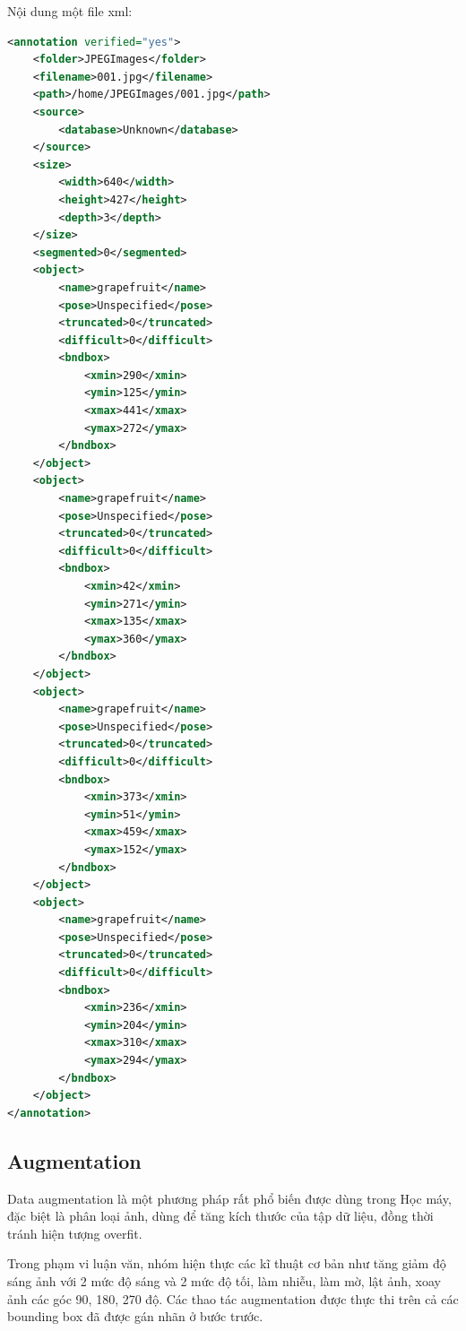 \cleardoublepage
Nội dung một file xml:
\begin{lstlisting}[language=XML]
<annotation verified="yes">
	<folder>JPEGImages</folder>
	<filename>001.jpg</filename>
	<path>/home/JPEGImages/001.jpg</path>
	<source>
		<database>Unknown</database>
	</source>
	<size>
		<width>640</width>
		<height>427</height>
		<depth>3</depth>
	</size>
	<segmented>0</segmented>
	<object>
		<name>grapefruit</name>
		<pose>Unspecified</pose>
		<truncated>0</truncated>
		<difficult>0</difficult>
		<bndbox>
			<xmin>290</xmin>
			<ymin>125</ymin>
			<xmax>441</xmax>
			<ymax>272</ymax>
		</bndbox>
	</object>
	<object>
		<name>grapefruit</name>
		<pose>Unspecified</pose>
		<truncated>0</truncated>
		<difficult>0</difficult>
		<bndbox>
			<xmin>42</xmin>
			<ymin>271</ymin>
			<xmax>135</xmax>
			<ymax>360</ymax>
		</bndbox>
	</object>
	<object>
		<name>grapefruit</name>
		<pose>Unspecified</pose>
		<truncated>0</truncated>
		<difficult>0</difficult>
		<bndbox>
			<xmin>373</xmin>
			<ymin>51</ymin>
			<xmax>459</xmax>
			<ymax>152</ymax>
		</bndbox>
	</object>
	<object>
		<name>grapefruit</name>
		<pose>Unspecified</pose>
		<truncated>0</truncated>
		<difficult>0</difficult>
		<bndbox>
			<xmin>236</xmin>
			<ymin>204</ymin>
			<xmax>310</xmax>
			<ymax>294</ymax>
		</bndbox>
	</object>
</annotation>
\end{lstlisting}
\subsection{Augmentation}
Data augmentation là một phương pháp rất phổ biến được dùng trong Học máy, đặc biệt là phân loại ảnh, dùng để tăng kích thước của tập dữ liệu, đồng thời tránh hiện tượng overfit.

Trong phạm vi luận văn, nhóm hiện thực các kĩ thuật cơ bản như tăng giảm độ sáng ảnh với 2 mức độ sáng và 2 mức độ tối, làm nhiễu, làm mờ, lật ảnh, xoay ảnh các góc 90, 180, 270 độ. Các thao tác augmentation được thực thi trên cả các bounding box đã được gán nhãn ở bước trước.

